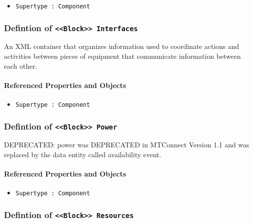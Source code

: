 \begin{itemize}
\item \texttt{Supertype : Component}

\end{itemize}
\FloatBarrier
\subsubsection{Defintion of \texttt{<<Block>> Interfaces}}
  \label{type:Interfaces}

\FloatBarrier

An XML container that organizes information used to coordinate actions and activities between pieces of equipment that communicate information between each other.

\FloatBarrier
\paragraph{Referenced Properties and Objects}

\begin{itemize}
\item \texttt{Supertype : Component}

\end{itemize}
\FloatBarrier
\subsubsection{Defintion of \texttt{<<Block>> Power}}
  \label{type:Power}

\FloatBarrier

DEPRECATED: power was DEPRECATED in MTConnect Version 1.1 and was replaced by the data entity called availability event.

\FloatBarrier
\paragraph{Referenced Properties and Objects}

\begin{itemize}
\item \texttt{Supertype : Component}

\end{itemize}
\FloatBarrier
\subsubsection{Defintion of \texttt{<<Block>> Resources}}
  \label{type:Resources}

\FloatBarrier


